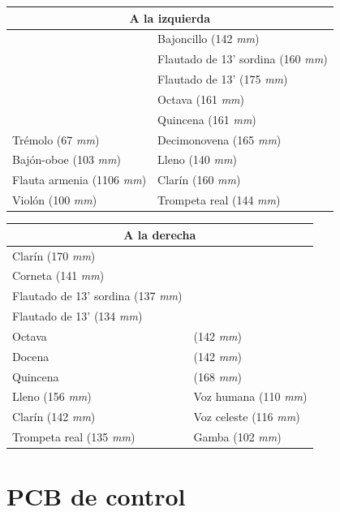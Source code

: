 \begin{center}
	\begin{tabular}{|l|l|}
		\hline \multicolumn{2}{|c|}{\textbf{A la izquierda}} \\	
		\hline & Bajoncillo (142 \textit{mm}) \\ 
		\hline & Flautado de 13' sordina (160 \textit{mm}) \\ 
		\hline & Flautado de 13' (175 \textit{mm})\\ 
		\hline & Octava (161 \textit{mm}) \\ 
		\hline & Quincena (161 \textit{mm}) \\ 
		\hline Trémolo (67 \textit{mm}) & Decimonovena (165 \textit{mm}) \\ 
		\hline Bajón-oboe (103 \textit{mm}) & Lleno (140 \textit{mm})  \\ 
		\hline Flauta armenia (1106 \textit{mm}) & Clarín (160 \textit{mm}) \\ 
		\hline  Violón (100 \textit{mm}) & Trompeta real (144 \textit{mm})  \\ 
		\hline
	\end{tabular}
	
	\begin{tabular}{|l|l|}
		\hline \multicolumn{2}{|c|}{\textbf{A la derecha}} \\
		\hline Clarín (170 \textit{mm}) &  \\ 
		\hline Corneta (141 \textit{mm}) &  \\ 
		\hline Flautado de 13' sordina (137 \textit{mm}) &  \\ 
		\hline Flautado de 13' (134 \textit{mm}) &  \\ 
		\hline Octava & (142 \textit{mm}) \\ 
		\hline Docena & (142 \textit{mm}) \\ 
		\hline Quincena & (168 \textit{mm}) \\ 
		\hline Lleno (156 \textit{mm}) & Voz humana (110 \textit{mm}) \\ 
		\hline Clarín (142 \textit{mm}) & Voz celeste (116 \textit{mm}) \\ 
		\hline Trompeta real (135 \textit{mm}) & Gamba (102 \textit{mm}) \\ 
		\hline 
	\end{tabular}
\end{center}

\section{PCB de control}

